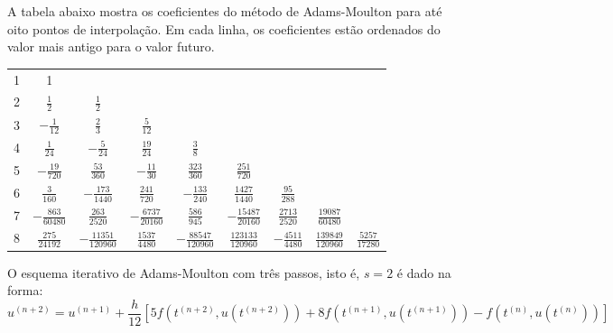 A tabela abaixo mostra os coeficientes do método de Adams-Moulton para até oito pontos de interpolação. Em cada linha, os coeficientes estão ordenados do valor mais antigo para o valor futuro.
 \begin{center}
\begin{tabular}{|c|cccccccc|}
\hline
1 & 1 &&&&&&&\\
2 & $\frac{1}{2}$ & $\frac{1}{2}$&&&&&&\\
3 & $-\frac{1}{12}$&$\frac{2}{3}$&$\frac{5}{12}$&&&&&\\
4 & $\frac{1}{24}$ & $-{\frac {5}{24}}$ & ${\frac {19}{24}}$ & $\frac{3}{8}$ &&&&\\
5 & $-{\frac {19}{720}}$ & ${\frac {53}{360}}$ & $-{\frac {11}{30}}$ & ${\frac {323}{360}}$ & ${\frac {251}{720}}$&&&\\
6 & ${\frac {3}{160}}$ & $-{\frac {173}{1440}}$ & ${\frac {241}{720}}$ & $-{\frac {133}{240}}$ & ${\frac {1427}{1440}}$ & ${\frac {95}{288}}$&&\\
7 & $-{\frac {863}{60480}}$ & ${\frac {263}{2520}}$ & $-{\frac {6737}{20160}}$ & ${\frac {586}{945}}$ & $-{\frac {15487}{20160}}$ & ${\frac {2713}{2520}}$ &${\frac {19087}{60480}}$&\\
8 &$ {\frac {275}{24192}}$ & $-{\frac {11351}{120960}}$&${\frac {1537}{4480}}$&$-{\frac {88547}{120960}}$&${\frac {123133}{120960}}$&$-{\frac {4511}{4480}}$&${\frac {139849}{120960}}$&${\frac {5257}{17280}}$\\
\hline
\end{tabular}
 \end{center}

\begin{ex} O esquema iterativo de Adams-Moulton com três passos, isto é, $s=2$ é dado na forma:
 \begin{equation}
  u^{(n+2)}=u^{(n+1)}+\frac{h}{12}\left[5f\left(t^{(n+2)},u(t^{(n+2)})\right)+8f\left(t^{(n+1)},u(t^{(n+1)})\right)-f\left(t^{(n)},u(t^{(n)})\right)\right]
 \end{equation}
 \end{ex}


